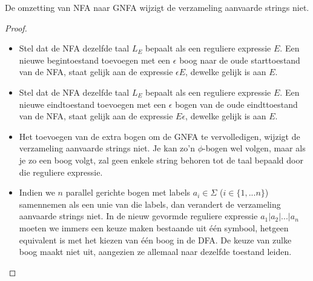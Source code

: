 \documentclass[../aanvullingen_cursus.tex]{subfiles}
\begin{document}
\begin{stelling}
	De omzetting van NFA naar GNFA wijzigt de verzameling aanvaarde strings niet.
\end{stelling}

\begin{proof}
	\hfill
	\begin{itemize}
		\item Stel dat de NFA dezelfde taal $L_E$ bepaalt als een reguliere expressie $E$. Een nieuwe begintoestand toevoegen met een $\epsilon$ boog naar de oude starttoestand van de NFA, staat gelijk aan de expressie $\epsilon E$, dewelke gelijk is aan $E$.
		\item Stel dat de NFA dezelfde taal $L_E$ bepaalt als een reguliere expressie $E$. Een nieuwe eindtoestand toevoegen met een $\epsilon$ bogen van de oude eindttoestand van de NFA, staat gelijk aan de expressie $E\epsilon$, dewelke gelijk is aan $E$.
		\item Het toevoegen van de extra bogen om de GNFA te vervolledigen, wijzigt de verzameling aanvaarde strings niet. Je kan zo'n $\phi$-bogen wel volgen, maar als je zo een boog volgt, zal geen enkele string behoren tot de taal bepaald door die reguliere expressie.
		\item Indien we \(n\) parallel gerichte bogen met labels $a_i \in \Sigma$ (\(i\in\{1,...n\}\)) samennemen als een unie van die labels, dan verandert de verzameling aanvaarde strings niet. In de nieuw gevormde reguliere expressie $a_1|a_2|...|a_n$ moeten we immers een keuze maken bestaande uit één symbool, hetgeen equivalent is met het kiezen van één boog in de DFA. De keuze van zulke boog maakt niet uit, aangezien ze allemaal naar dezelfde toestand leiden.
	\end{itemize}
\end{proof}
\end{document}
